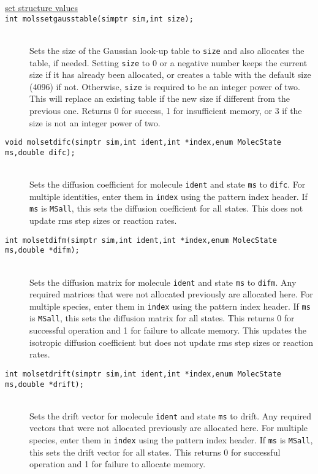 \documentclass {book}
\newcommand {\ttt} {\texttt}
\begin{document}
\begin{description}
\item[\underline{set structure values}]

\item[\ttt{int molssetgausstable(simptr sim,int size);}]
\hfill \\
Sets the size of the Gaussian look-up table to \ttt{size} and also allocates the table, if needed. Setting \ttt{size} to 0 or a negative number keeps the current size if it has already been allocated, or creates a table with the default size (4096) if not. Otherwise, \ttt{size} is required to be an integer power of two. This will replace an existing table if the new size if different from the previous one. Returns 0 for success, 1 for insufficient memory, or 3 if the size is not an integer power of two.

\item[\ttt{void molsetdifc(simptr sim,int ident,int *index,enum MolecState ms,double difc);}]
\hfill \\
Sets the diffusion coefficient for molecule \ttt{ident} and state \ttt{ms} to \ttt{difc}. For multiple identities, enter them in \ttt{index} using the pattern index header. If \ttt{ms} is \ttt{MSall}, this sets the diffusion coefficient for all states. This does not update rms step sizes or reaction rates.

\item[\ttt{int molsetdifm(simptr sim,int ident,int *index,enum MolecState ms,double *difm);}]
\hfill \\
Sets the diffusion matrix for molecule \ttt{ident} and state \ttt{ms} to \ttt{difm}. Any required matrices that were not allocated previously are allocated here. For multiple species, enter them in \ttt{index} using the pattern index header. If \ttt{ms} is \ttt{MSall}, this sets the diffusion matrix for all states. This returns 0 for successful operation and 1 for failure to allcate memory. This updates the isotropic diffusion coefficient but does not update rms step sizes or reaction rates.

\item[\ttt{int molsetdrift(simptr sim,int ident,int *index,enum MolecState ms,double *drift);}]
\hfill \\
Sets the drift vector for molecule \ttt{ident} and state \ttt{ms} to drift. Any required vectors that were not allocated previously are allocated here. For multiple species, enter them in \ttt{index} using the pattern index header. If \ttt{ms} is \ttt{MSall}, this sets the drift vector for all states. This returns 0 for successful operation and 1 for failure to allocate memory.


\end{description}
\end{document}

